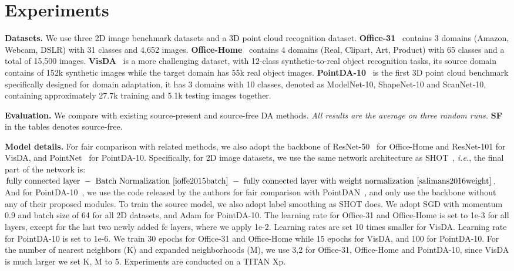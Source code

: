 \documentclass{article}
\begin{document}
\section{Experiments}\label{sec:exp}
\noindent \textbf{Datasets.} We use three 2D image benchmark datasets and a 3D point cloud recognition dataset. \textbf{Office-31}~\cite{saenko2010adapting} contains 3 domains (Amazon, Webcam, DSLR) with 31 classes and 4,652 images. \textbf{Office-Home}~\cite{venkateswara2017deep} contains 4 domains (Real, Clipart, Art, Product) with 65 classes and a total of 15,500 images. \textbf{VisDA}~\cite{peng2017visda} is a more challenging dataset, with 12-class synthetic-to-real object recognition tasks, its source domain contains of 152k synthetic images while the target domain has 55k real object images. \textbf{PointDA-10}~\cite{qin2019pointdan} is the first 3D point cloud benchmark specifically designed for domain adaptation, it has 3 domains with 10 classes, denoted as ModelNet-10, ShapeNet-10 and ScanNet-10, containing approximately 27.7k training and 5.1k testing images together.

\noindent \textbf{Evaluation.} We compare with existing source-present and source-free DA methods. \textit{All results are the average on three random runs.} \textbf{SF} in the tables denotes source-free.

\noindent \textbf{Model details.} For fair comparison with related methods, we also adopt the backbone of ResNet-50~\cite{he2016deep} for Office-Home and  ResNet-101 for VisDA, and PointNet~\cite{qi2017pointnet} for PointDA-10. Specifically, for 2D image datasets, we use the same network architecture as SHOT~\cite{liang2020we}, \textit{i.e.}, the final part of the network is: $\text{fully connected layer}\ -\ \text{Batch Normalization~\cite{ioffe2015batch}}\ -\ \text{fully connected layer}\ \text{with weight normalization~\cite{salimans2016weight}}$.
And for PointDA-10~\cite{qi2017pointnet}, we use the code released by the authors for fair comparison with PointDAN~\cite{qi2017pointnet}, and only use the backbone without any of their proposed modules. To train the source model, we also adopt label smoothing as SHOT does. We adopt SGD with momentum 0.9 and batch size of 64 for all 2D datasets, and Adam for PointDA-10. The learning rate for Office-31 and Office-Home is set to 1e-3 for all layers, except for the last two newly added fc layers, where we apply 1e-2. Learning rates are set 10 times smaller for VisDA. Learning rate for PointDA-10 is set to 1e-6. We train 30 epochs for Office-31 and Office-Home while 15 epochs for VisDA, and 100 for PointDA-10. For the number of nearest neighbors (K) and expanded neighborhoods (M), we use 3,2 for Office-31, Office-Home and PointDA-10, since VisDA is much larger we set K, M to 5. Experiments are conducted on a TITAN Xp. 
\end{document}
